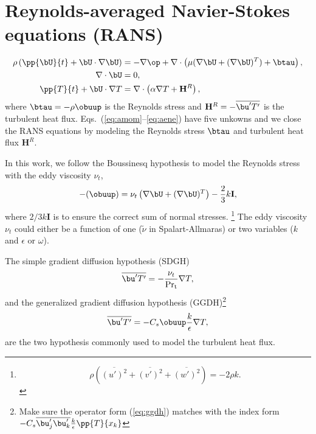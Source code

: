 \section{Reynolds-averaged Navier-Stokes equations (RANS)}
%
\begin{align}
   \rho \left(\pp{\bU}{t} + \bU \cdot \nabla \bU\right) & = - \nabla \op + \nabla
\cdot \left(\mu (\nabla \bU + (\nabla \bU)^T) + \btau \right), \label{eq:amom}\\
   \nabla \cdot \bU & = 0, \label{eq:acont} \\ 
   \pp{T}{t} + \bU \cdot \nabla T & =  \nabla
\cdot \left(\alpha \nabla T + \mathbf{H}^R \right), \label{eq:aene}
\end{align}
%
where $\btau=-\rho\obuup$ is the Reynolds stress and $\mathbf{H}^R =
-\overline{\bu'T'}$ is the turbulent heat flux.
Eqs.~(\ref{eq:amom}--\ref{eq:aene}) have five unkowns and we close the RANS
equations by modeling the Reynolds stress $\btau$ and turbulent heat flux $\mathbf{H}^R$.

In this work, we follow the Boussinesq hypothesis to model the Reynolds stress
with the eddy viscosity $\nu_t$,
%
\begin{align}
   - (\obuup) = \nu_t \left(\nabla \bU + (\nabla \bU)^T \right) -
\frac{2}{3} k \mathbf{I}, \label{eq:evm}
\end{align}
%
where $2/3 k \mathbf{I}$ is to ensure the correct sum of normal stresses.
\footnote{\begin{equation} \rho
(\overline{(u')^2}+\overline{(v')^2}+\overline{(w')^2}) = -2\rho k.
\end{equation}} 
The eddy viscosity $\nu_t$ could either be a function of one
($\tilde{\nu}$ in Spalart-Allmaras) or two variables ($k$ and $\epsilon$ or
$\omega$).

The simple gradient diffusion hypothesis (SDGH) 
%
\begin{equation}
   \overline{\bu'T'} = -\frac{\nu_t}{\rm Pr_t}\nabla T, \label{eq:sdgh}
\end{equation}
%
and the generalized gradient diffusion hypothesis (GGDH)\footnote{Make sure the
operator form (\ref{eq:ggdh}) matches with the index form $ -C_s
\overline{\bu'_j\bu'_k} \frac{k}{\epsilon} \pp{T}{x_k}$}
%
\begin{equation} 
   \overline{\bu'T'} = -C_s \obuup \frac{k}{\epsilon} \nabla T,
\label{eq:ggdh}
\end{equation}
%
are the two hypothesis \cite{hsieh2004numerical} commonly used to model the
turbulent heat flux.

